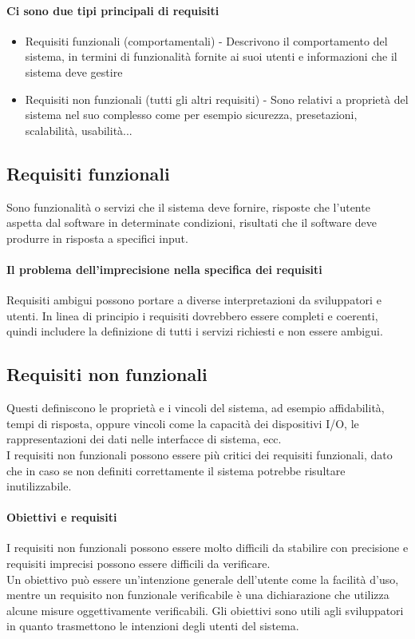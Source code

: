 \paragraph*{Ci sono due tipi principali di requisiti}
\begin{itemize}
    \item Requisiti funzionali (comportamentali) - Descrivono il comportamento del
    sistema, in termini di funzionalità fornite ai suoi utenti e informazioni
    che il sistema deve gestire
    \item Requisiti non funzionali (tutti gli altri requisiti) - Sono relativi
    a proprietà del sistema nel suo complesso come per esempio sicurezza, presetazioni,
    scalabilità, usabilità...
\end{itemize}
\subsection{Requisiti funzionali}
Sono funzionalità o servizi che il sistema deve fornire, risposte che l'utente
aspetta dal software in determinate condizioni, risultati che il software deve produrre
in risposta a specifici input.
\paragraph{Il problema dell'imprecisione nella specifica dei requisiti}
Requisiti ambigui possono portare a diverse interpretazioni da sviluppatori e utenti.
In linea di principio i requisiti dovrebbero essere completi e coerenti, quindi
includere la definizione di tutti i servizi richiesti e non essere ambigui.
\subsection{Requisiti non funzionali}
Questi definiscono le proprietà e i vincoli del sistema, ad esempio affidabilità,
tempi di risposta, oppure vincoli come la capacità dei dispositivi I/O,
le rappresentazioni dei dati nelle interfacce di sistema, ecc.
\\I requisiti non funzionali possono essere più critici dei requisiti funzionali, dato che
in caso se non definiti correttamente il sistema potrebbe risultare inutilizzabile.
\paragraph*{Obiettivi e requisiti} I requisiti non funzionali possono essere molto
difficili da stabilire con precisione e requisiti imprecisi possono essere
difficili da verificare.
\\ Un obiettivo può essere un'intenzione generale dell'utente come la facilità d'uso,
mentre un requisito non funzionale verificabile è una dichiarazione che utilizza
alcune misure oggettivamente verificabili.
Gli obiettivi sono utili agli sviluppatori in quanto trasmettono le intenzioni degli
utenti del sistema.

